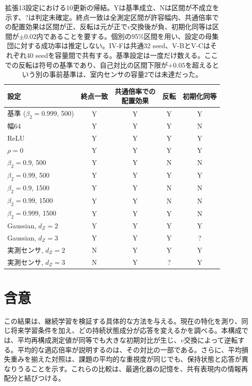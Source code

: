 \begin{table}[t]
\centering\small
\caption{拡張13設定における10更新の帰結。Yは基準成立、Nは区間が不成立を示す、?は判定未確定。終点一致は全測定区間が許容幅内、共通倍率での配置効果は区間が正、反転は元が正で$v$交換後が負、初期化同等は区間が$\pm0.02$内であることを要する。個別の95\%区間を用い、設定の母集団に対する成功率は推定しない。IV-Fは共通32 seed、V-BとV-Cはそれぞれ40 seedを容量間で共有する。基準設定は一度だけ数える。ここでの反転は符号の基準であり、自己対比の区間下限が$+0.05$を超えるという別の事前基準は、室内センサの容量2では未達だった。}
\label{tab:claims}
\begin{tabular}{lcccc}
\toprule
設定 & 終点一致 & \shortstack{共通倍率での\\配置効果} & 反転 & 初期化同等\\
\midrule
基準 ($\beta_2=0.999$, 500) & Y & Y & Y & Y\\
幅64 & Y & Y & Y & N\\
ReLU & Y & Y & Y & Y\\
$\rho=0$ & Y & Y & Y & Y\\
$\beta_2=0.9$, 500 & Y & Y & N & N\\
$\beta_2=0.99$, 500 & Y & Y & Y & Y\\
$\beta_2=0.9$, 1500 & Y & Y & N & N\\
$\beta_2=0.99$, 1500 & Y & Y & N & N\\
$\beta_2=0.999$, 1500 & Y & Y & Y & N\\
Gaussian, $d_Z=2$ & Y & Y & Y & Y\\
Gaussian, $d_Z=3$ & Y & Y & Y & ?\\
実測センサ, $d_Z=2$ & N & Y & Y & Y\\
実測センサ, $d_Z=3$ & N & Y & ? & Y\\
\bottomrule
\end{tabular}
\end{table}

\section{含意}
\label{sec:scope}
この結果は、継続学習を検証する具体的な方法を与える。現在の特化を測り、同じ将来学習条件を加え、どの持続状態成分が応答を変えるかを調べる。本構成では、平均再構成測定値が同等でも大きな初期対比が生じ、$v$交換によって逆転する。平均的な適応倍率が説明するのは、その対比の一部である。さらに、平均損失重みを揃えた対照は、課題の平均的な重視度が同じでも、保持状態と応答が異なりうることを示す。これらの比較は、最適化器の記憶を、共有表現内の情報再配分と結びつける。

